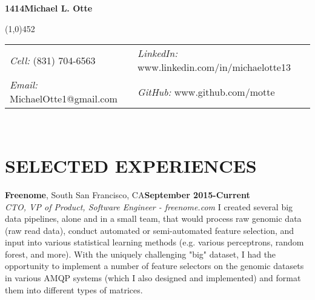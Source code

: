 \documentclass[a4paper, 10pt]{article}
\makeatletter
\newcommand\header{\@setfontsize\Huge{14}{14}} %
\makeatother
\begin{document}
\noindent
\textbf{\header Michael L. Otte}
\vspace{-3mm}

\noindent
\line(1,0){452}\\[2mm]
\begin{tabular}{ |p{2.9in}|p{3.75in}| }
{\sl Cell:} (831) 704-6563 & {\sl LinkedIn:} www.linkedin.com/in/michaelotte13 \\[0mm]
{\sl Email:} MichaelOtte1@gmail.com & {\sl GitHub:} www.github.com/motte \\[3mm]
\end{tabular}\\[-5mm]

\section*{SELECTED EXPERIENCES}
\vspace{-3mm}

{\bf Freenome}{, South San Francisco, CA}\hfill {\bf September 2015-Current \\}
{\sl CTO, VP of Product, Software Engineer - freenome.com} \newline
\indent I created several big data pipelines, alone and in a small team, that would process raw genomic data (raw read data), conduct automated or semi-automated feature selection, and input into various statistical learning methods (e.g. various perceptrons, random forest, and more).  With the uniquely challenging "big" dataset, I had the opportunity to implement a number of feature selectors on the genomic datasets in various AMQP systems (which I also designed and implemented) and format them into different types of matrices.
\end{document}
